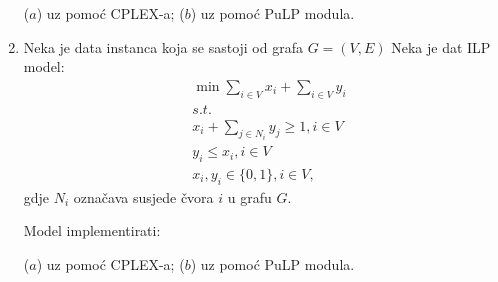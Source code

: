\documentclass[a4paper, utf8, 11pt, colorlinks]{book}
\theoremstyle{definition}
\begin{document}
\begin{enumerate}
     ($a$) uz pomoć CPLEX-a; ($b$) uz pomoć PuLP modula.
    \item %
    Neka je data instanca koja se sastoji od grafa $G=(V,E)$ %
    Neka je dat ILP model:
    \begin{align*}
          &\min \sum_{i \in V} x_i + \sum_{i \in V} y_i \\
          &s.t. \\
          & x_i + \sum_{j \in N_i } y_j  \geq 1, i \in V \\
          & y_i \leq x_i, i \in V \\
          &x_i, y_i \in \{0, 1\}, i \in V,
    \end{align*}
gdje $N_i$ označava susjede čvora $i$ u grafu $G$. 

Model implementirati:

($a$) uz pomoć CPLEX-a; ($b$) uz pomoć PuLP modula. 
\end{enumerate}
\end{document}
